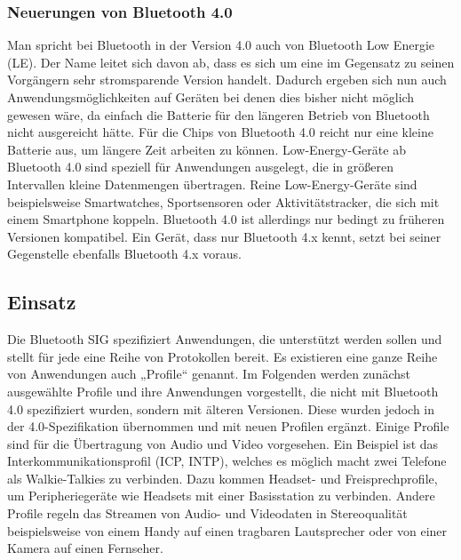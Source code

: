 \begin{multicols}{3}

\subsubsection*{Neuerungen von Bluetooth 4.0}
Man spricht bei Bluetooth in der Version 4.0 auch von Bluetooth Low Energie (LE). Der Name leitet sich davon ab, dass es sich um eine im Gegensatz zu seinen Vorgängern sehr stromsparende Version handelt. Dadurch ergeben sich nun auch Anwendungsmöglichkeiten auf Geräten bei denen dies bisher nicht möglich gewesen wäre, da einfach die Batterie für den längeren Betrieb von Bluetooth nicht ausgereicht hätte. Für die Chips von Bluetooth 4.0 reicht nur eine kleine Batterie aus, um längere Zeit arbeiten zu können. Low-Energy-Geräte ab Bluetooth 4.0 sind speziell für Anwendungen ausgelegt, die in größeren Intervallen kleine Datenmengen übertragen. Reine Low-Energy-Geräte sind beispielsweise Smartwatches, Sportsensoren oder Aktivitätstracker, die sich mit einem Smartphone koppeln. Bluetooth 4.0 ist allerdings nur bedingt zu früheren Versionen kompatibel. Ein Gerät, dass nur Bluetooth 4.x kennt, setzt bei seiner Gegenstelle ebenfalls Bluetooth 4.x voraus.\cite{Bluetooth_4.6}

\subsection*{Einsatz}
Die Bluetooth SIG spezifiziert Anwendungen, die unterstützt werden sollen und stellt für jede eine Reihe von Protokollen bereit. Es existieren eine ganze Reihe von Anwendungen auch „Profile“ genannt. Im Folgenden werden zunächst ausgewählte Profile und ihre Anwendungen vorgestellt, die nicht mit Bluetooth 4.0 spezifiziert wurden, sondern mit älteren Versionen. Diese wurden jedoch in der 4.0-Spezifikation übernommen und mit neuen Profilen ergänzt. Einige Profile sind für die Übertragung von Audio und Video vorgesehen. Ein Beispiel ist das Interkommunikationsprofil (ICP, INTP), welches es möglich macht zwei Telefone als Walkie-Talkies zu verbinden. Dazu kommen Headset- und Freisprechprofile, um Peripheriegeräte wie Headsets mit einer Basisstation zu verbinden. Andere Profile regeln das Streamen von Audio- und Videodaten in Stereoqualität beispielsweise von einem Handy auf einen tragbaren Lautsprecher oder von einer Kamera auf einen Fernseher. 


\end{multicols}
